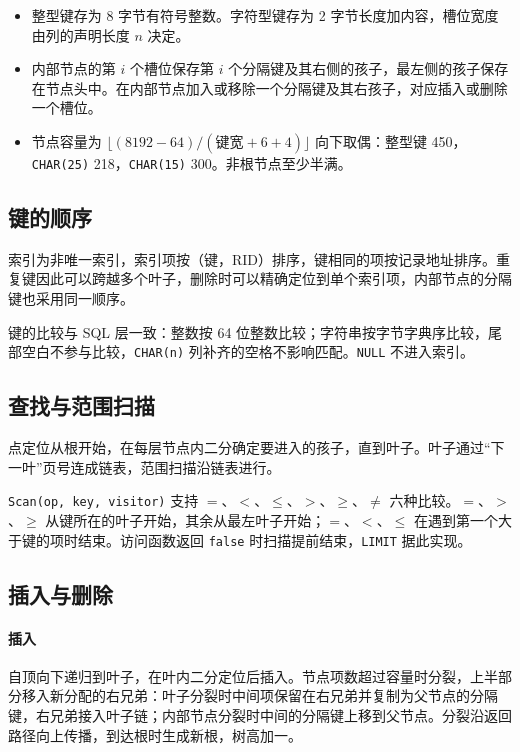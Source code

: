 \documentclass[11pt,a4paper]{ctexart}
\newcommand{\code}[1]{\texttt{#1}}
\begin{document}
\begin{itemize}
  \item 整型键存为 8 字节有符号整数。字符型键存为 2 字节长度加内容，槽位宽度由列的声明长度 $n$ 决定。
  \item 内部节点的第 $i$ 个槽位保存第 $i$ 个分隔键及其右侧的孩子，最左侧的孩子保存在节点头中。在内部节点加入或移除一个分隔键及其右孩子，对应插入或删除一个槽位。
  \item 节点容量为 $\lfloor (8192-64)/(\text{键宽}+6+4) \rfloor$ 向下取偶：整型键 450，\code{CHAR(25)} 218，\code{CHAR(15)} 300。非根节点至少半满。
\end{itemize}

\subsection{键的顺序}

索引为非唯一索引，索引项按（键，RID）排序，键相同的项按记录地址排序。重复键因此可以跨越多个叶子，删除时可以精确定位到单个索引项，内部节点的分隔键也采用同一顺序。

键的比较与 SQL 层一致：整数按 64 位整数比较；字符串按字节字典序比较，尾部空白不参与比较，\code{CHAR(n)} 列补齐的空格不影响匹配。\code{NULL} 不进入索引。

\subsection{查找与范围扫描}

点定位从根开始，在每层节点内二分确定要进入的孩子，直到叶子。叶子通过“下一叶”页号连成链表，范围扫描沿链表进行。

\code{Scan(op, key, visitor)} 支持 $=$、$<$、$\leq$、$>$、$\geq$、$\neq$ 六种比较。$=$、$>$、$\geq$ 从键所在的叶子开始，其余从最左叶子开始；$=$、$<$、$\leq$ 在遇到第一个大于键的项时结束。访问函数返回 \code{false} 时扫描提前结束，\code{LIMIT} 据此实现。

\subsection{插入与删除}

\paragraph{插入}自顶向下递归到叶子，在叶内二分定位后插入。节点项数超过容量时分裂，上半部分移入新分配的右兄弟：叶子分裂时中间项保留在右兄弟并复制为父节点的分隔键，右兄弟接入叶子链；内部节点分裂时中间的分隔键上移到父节点。分裂沿返回路径向上传播，到达根时生成新根，树高加一。
\end{document}
